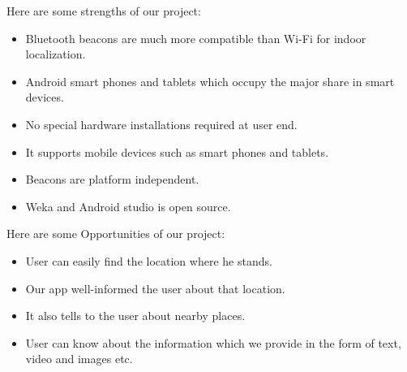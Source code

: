 \documentclass{article}
\begin{document}
Here are some strengths of our project:
\begin{itemize}
\item Bluetooth beacons are much more compatible than Wi-Fi for indoor localization.
\item Android smart phones and tablets which occupy the major share in smart devices.
\item No special hardware installations required at user end.
\item It supports mobile devices such as  smart phones and tablets. 
\item Beacons are platform independent. 
\item Weka and Android studio is open source.
\end{itemize}
Here are some Opportunities of our project:
\begin{itemize}
\item User can easily find the location where he stands.
\item Our app well-informed the user about that location.
\item It also tells to the user about nearby places.
\item User can know about the information which we provide in the form of text, video and images etc.
\end{itemize}
\pagebreak
\end{document}
